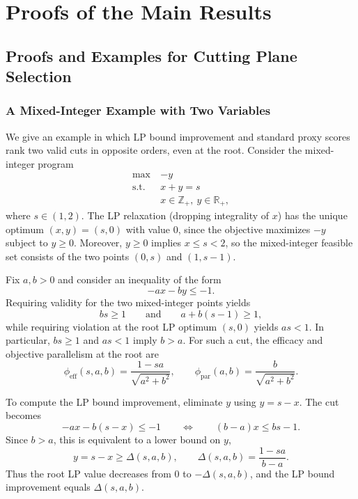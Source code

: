 \documentclass[smallextended,envcountsect]{svjour3} %
\newcommand{\R}{\mathbb{R}}
\newcommand{\Z}{\mathbb{Z}}
\newcommand{\0}{\mathbf{0}}
\newcommand{\1}{\mathbf{1}} %
\begin{document}
\section{Proofs of the Main Results}\label{sec:proofs}

\subsection{Proofs and Examples for Cutting Plane Selection}
\label{app:cutting_proofs}

\subsubsection{A Mixed-Integer Example with Two Variables}
\label{app:toy_cut_mismatch}
We give an example in which LP bound improvement and standard proxy scores rank two valid cuts in opposite orders, even at the root. Consider the mixed-integer program
\begin{align*}
	\max\        & -y                    \\
	\text{s.t. } & x + y = s             \\
	             & x \in \Z_+,\ y \in \R_+,
\end{align*}
where $s\in(1,2)$. The LP relaxation (dropping integrality of $x$) has the unique optimum $(x,y)=(s,0)$ with value $0$, since the objective maximizes $-y$ subject to $y\ge 0$.
Moreover, $y\ge 0$ implies $x\le s<2$, so the mixed-integer feasible set consists of the two points $(0,s)$ and $(1,s-1)$.

Fix $a,b>0$ and consider an inequality of the form
\[
	-ax-by\le -1.
\]
Requiring validity for the two mixed-integer points yields
\[
	bs\ge 1
	\qquad\text{and}\qquad
	a+b(s-1)\ge 1,
\]
while requiring violation at the root LP optimum $(s,0)$ yields $as<1$.
In particular, $bs\ge 1$ and $as<1$ imply $b>a$.
For such a cut, the efficacy and objective parallelism at the root are
\[
	\phi_{\text{eff}}(s,a,b)=\frac{1-sa}{\sqrt{a^2+b^2}},
	\qquad
	\phi_{\text{par}}(a,b)=\frac{b}{\sqrt{a^2+b^2}}.
\]

To compute the LP bound improvement, eliminate $y$ using $y=s-x$. The cut becomes
\[
	-ax-b(s-x)\le -1
	\qquad\Longleftrightarrow\qquad
	(b-a)x\le bs-1.
\]
Since $b>a$, this is equivalent to a lower bound on $y$,
\[
	y=s-x \ge \Delta(s,a,b),
	\qquad
	\Delta(s,a,b)=\frac{1-sa}{b-a}.
\]
Thus the root LP value decreases from $0$ to $-\Delta(s,a,b)$, and the LP bound improvement equals $\Delta(s,a,b)$.
\end{document}
